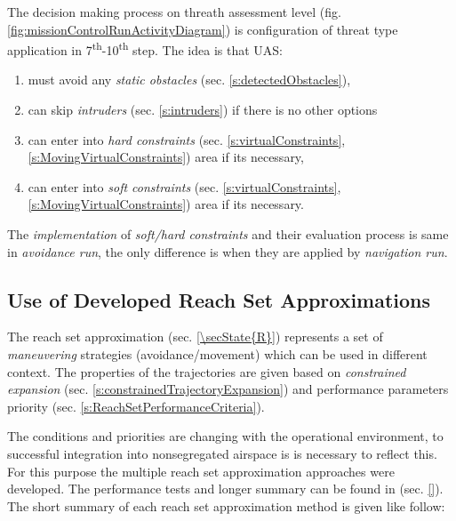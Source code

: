 The decision making process on threath assessment level (fig. \ref{fig:missionControlRunActivityDiagram}) is configuration of threat type application in 7\textsuperscript{th}-10\textsuperscript{th} step. The idea is that UAS:
\begin{enumerate}
    \item must avoid any \emph{static obstacles} (sec. \ref{s:detectedObstacles}),
    
    \item can skip \emph{intruders} (sec. \ref{s:intruders}) if there is no other options
    
    \item can enter into \emph{hard constraints} (sec. \ref{s:virtualConstraints}, \ref{s:MovingVirtualConstraints}) area if its necessary,
    
    \item can enter into \emph{soft constraints} (sec. \ref{s:virtualConstraints}, \ref{s:MovingVirtualConstraints}) area if its necessary.
\end{enumerate}

\begin{note}
    The \emph{implementation} of \emph{soft/hard constraints} and their evaluation process is same in \emph{avoidance run}, the only difference is when they are applied by \emph{navigation run}.
\end{note}
    
\subsection{Use of Developed Reach Set Approximations}\label{s:conclusionReachSet}

\noindent The reach set approximation (sec. \ref{\secState{R}}) represents a set of  \emph{maneuvering} strategies (avoidance/movement) which can be used in different context. The properties of the trajectories are given based on \emph{constrained expansion} (sec. \ref{s:constrainedTrajectoryExpansion}) and performance parameters priority (sec. \ref{s:ReachSetPerformanceCriteria}).

The conditions and priorities are changing with the operational environment, to successful integration into nonsegregated airspace is is necessary to reflect this.  For this purpose the multiple reach set approximation approaches were developed. The performance tests and longer summary can be found in (sec. \ref{}). The short summary of each reach set approximation method is given like follow:

